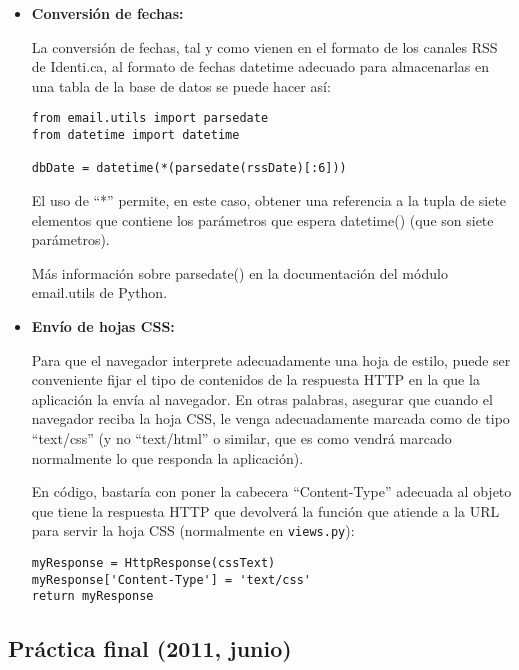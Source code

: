 \begin{itemize}
\item \textbf{Conversión de fechas:}

La conversión de fechas, tal y como vienen en el formato de los canales RSS de Identi.ca, al formato de fechas datetime adecuado para almacenarlas en una tabla de la base de datos se puede hacer así:

\begin{verbatim}
from email.utils import parsedate
from datetime import datetime

dbDate = datetime(*(parsedate(rssDate)[:6]))
\end{verbatim}

El uso de ``*'' permite, en este caso, obtener una referencia a la tupla de siete elementos que contiene los parámetros que espera datetime() (que son siete parámetros).

Más información sobre parsedate() en la documentación del módulo email.utils de Python.

\item \textbf{Envío de hojas CSS:}

Para que el navegador interprete adecuadamente una hoja de estilo, puede ser conveniente fijar el tipo de contenidos de la respuesta HTTP en la que la aplicación la envía al navegador. En otras palabras, asegurar que cuando el navegador reciba la hoja CSS, le venga adecuadamente marcada como de tipo ``text/css'' (y no ``text/html'' o similar, que es como vendrá marcado normalmente lo que responda la aplicación).

En código, bastaría con poner la cabecera ``Content-Type'' adecuada al objeto que tiene la respuesta HTTP que devolverá la función que atiende a la URL para servir la hoja CSS (normalmente en \texttt{views.py}):

\begin{verbatim}
myResponse = HttpResponse(cssText)
myResponse['Content-Type'] = 'text/css'
return myResponse
\end{verbatim}

\end{itemize}


\subsection{Práctica final (2011, junio)}

